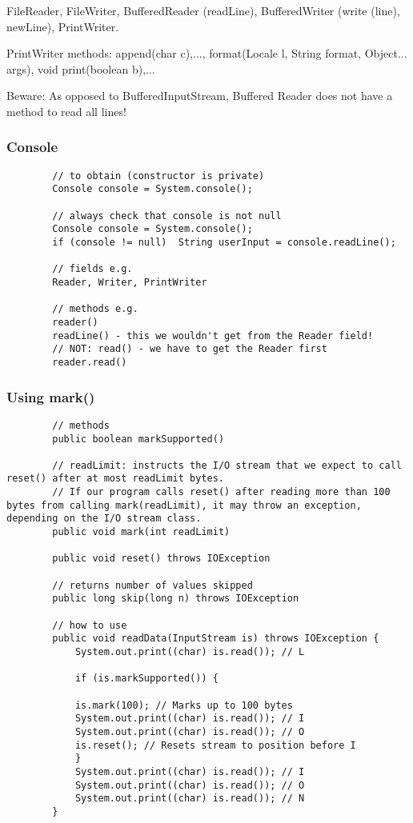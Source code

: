 \documentclass{scrartcl}
\begin{document}
    FileReader, FileWriter, BufferedReader (readLine), BufferedWriter (write (line), newLine), PrintWriter.

    PrintWriter methods: append(char c),..., format(Locale l, String format, Object... args), void print(boolean b),...

    Beware: As opposed to BufferedInputStream, Buffered Reader does not have a method to read all lines!

\subsubsection{Console}

    \begin{lstlisting}
        // to obtain (constructor is private)
        Console console = System.console();

        // always check that console is not null
        Console console = System.console();
        if (console != null)  String userInput = console.readLine();

        // fields e.g.
        Reader, Writer, PrintWriter

        // methods e.g.
        reader()
        readLine() - this we wouldn't get from the Reader field!
        // NOT: read() - we have to get the Reader first
        reader.read()
    \end{lstlisting}

\subsubsection{Using mark()}

    \begin{lstlisting}
        // methods
        public boolean markSupported()

        // readLimit: instructs the I/O stream that we expect to call reset() after at most readLimit bytes.
        // If our program calls reset() after reading more than 100 bytes from calling mark(readLimit), it may throw an exception, depending on the I/O stream class.
        public void mark(int readLimit)

        public void reset() throws IOException

        // returns number of values skipped
        public long skip(long n) throws IOException

        // how to use
        public void readData(InputStream is) throws IOException {
            System.out.print((char) is.read()); // L

            if (is.markSupported()) {

            is.mark(100); // Marks up to 100 bytes
            System.out.print((char) is.read()); // I
            System.out.print((char) is.read()); // O
            is.reset(); // Resets stream to position before I
            }
            System.out.print((char) is.read()); // I
            System.out.print((char) is.read()); // O
            System.out.print((char) is.read()); // N
        }
    \end{lstlisting}
\end{document}
